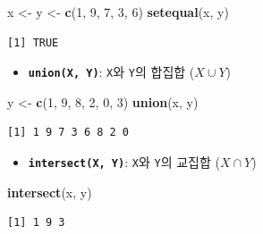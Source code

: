 \documentclass[
  11pt,
]{krantz}
\newenvironment{Shaded}{\begin{snugshade}}{\end{snugshade}}
\newcommand{\DecValTok}[1]{\textcolor[rgb]{0.06,0.06,0.06}{#1}}
\newcommand{\KeywordTok}[1]{\textcolor[rgb]{0.27,0.27,0.27}{\textbf{#1}}}
\newcommand{\NormalTok}[1]{#1}
\newcommand{\StringTok}[1]{\textcolor[rgb]{0.5,0.5,0.5}{#1}}
\providecommand{\tightlist}{%
  \setlength{\itemsep}{0pt}\setlength{\parskip}{0pt}}
\begin{document}
\footnotesize

\begin{Shaded}
\begin{Highlighting}[]
\NormalTok{x <-}\StringTok{ }\NormalTok{y <-}\StringTok{ }\KeywordTok{c}\NormalTok{(}\DecValTok{1}\NormalTok{, }\DecValTok{9}\NormalTok{, }\DecValTok{7}\NormalTok{, }\DecValTok{3}\NormalTok{, }\DecValTok{6}\NormalTok{)}
\KeywordTok{setequal}\NormalTok{(x, y)}
\end{Highlighting}
\end{Shaded}

\begin{verbatim}
[1] TRUE
\end{verbatim}

\normalsize

\begin{itemize}
\tightlist
\item
  \textbf{\texttt{union(X,\ Y)}}: \texttt{X}와 \texttt{Y}의 합집합 (\(X \cup Y\))
\end{itemize}

\footnotesize

\begin{Shaded}
\begin{Highlighting}[]
\NormalTok{y <-}\StringTok{ }\KeywordTok{c}\NormalTok{(}\DecValTok{1}\NormalTok{, }\DecValTok{9}\NormalTok{, }\DecValTok{8}\NormalTok{, }\DecValTok{2}\NormalTok{, }\DecValTok{0}\NormalTok{, }\DecValTok{3}\NormalTok{)}
\KeywordTok{union}\NormalTok{(x, y)}
\end{Highlighting}
\end{Shaded}

\begin{verbatim}
[1] 1 9 7 3 6 8 2 0
\end{verbatim}

\normalsize

\begin{itemize}
\tightlist
\item
  \textbf{\texttt{intersect(X,\ Y)}}: \texttt{X}와 \texttt{Y}의 교집합 (\(X \cap Y\))
\end{itemize}

\footnotesize

\begin{Shaded}
\begin{Highlighting}[]
\KeywordTok{intersect}\NormalTok{(x, y)}
\end{Highlighting}
\end{Shaded}

\begin{verbatim}
[1] 1 9 3
\end{verbatim}
\end{document}

